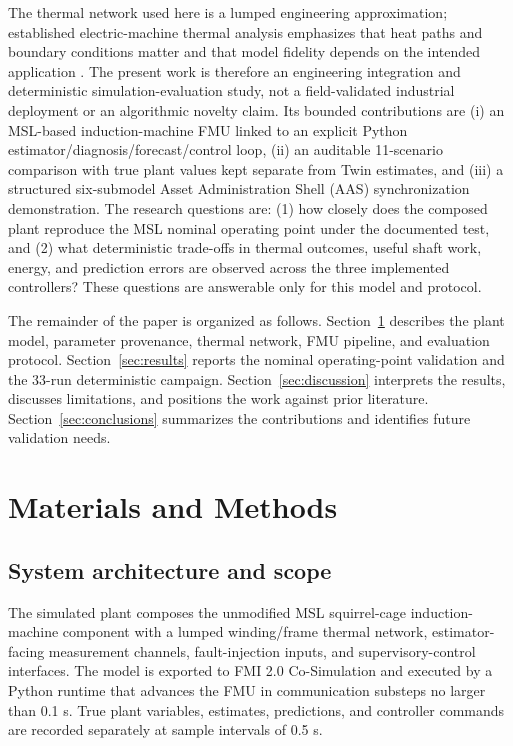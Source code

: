 \documentclass[machines,article,submit,moreauthors]{Definitions/mdpi}
\begin{document}
The thermal network used here is a lumped engineering approximation; established electric-machine thermal analysis emphasizes that heat paths and boundary conditions matter and that model fidelity depends on the intended application \cite{staton2005}. The present work is therefore an engineering integration and deterministic simulation-evaluation study, not a field-validated industrial deployment or an algorithmic novelty claim. Its bounded contributions are (i) an MSL-based induction-machine FMU linked to an explicit Python estimator/diagnosis/forecast/control loop, (ii) an auditable 11-scenario comparison with true plant values kept separate from Twin estimates, and (iii) a structured six-submodel Asset Administration Shell (AAS) synchronization demonstration. The research questions are: (1) how closely does the composed plant reproduce the MSL nominal operating point under the documented test, and (2) what deterministic trade-offs in thermal outcomes, useful shaft work, energy, and prediction errors are observed across the three implemented controllers? These questions are answerable only for this model and protocol.

The remainder of the paper is organized as follows. Section~\ref{sec:methods} describes the plant model, parameter provenance, thermal network, FMU pipeline, and evaluation protocol. Section~\ref{sec:results} reports the nominal operating-point validation and the 33-run deterministic campaign. Section~\ref{sec:discussion} interprets the results, discusses limitations, and positions the work against prior literature. Section~\ref{sec:conclusions} summarizes the contributions and identifies future validation needs.

\section{Materials and Methods}
\label{sec:methods}

\subsection{System architecture and scope}

The simulated plant composes the unmodified MSL squirrel-cage induction-machine component with a lumped winding/frame thermal network, estimator-facing measurement channels, fault-injection inputs, and supervisory-control interfaces. The model is exported to FMI 2.0 Co-Simulation and executed by a Python runtime that advances the FMU in communication substeps no larger than 0.1 s. True plant variables, estimates, predictions, and controller commands are recorded separately at sample intervals of 0.5 s.
\end{document}
